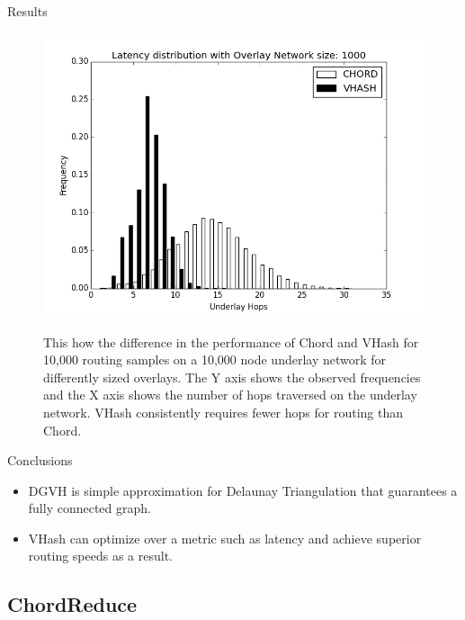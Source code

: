 \documentclass[11pt]{beamer}
\begin{document}
\begin{frame}{Results}
	\begin{figure}
		
		\centering
		\includegraphics[width=0.5\linewidth]{figs/hist_1000}
		\label{fig:hist1000}
		\caption{This how the difference in the performance of Chord and VHash for 10,000 routing samples on a 10,000 node underlay network for differently sized overlays.
			The Y axis shows the observed frequencies and the X axis shows the number of hops traversed on the underlay network.
			VHash consistently requires fewer hops for routing than Chord.}
	\end{figure}
	
\end{frame}


\begin{frame}{Conclusions}
	\begin{itemize}
		\item DGVH is simple approximation for Delaunay Triangulation that guarantees a fully connected graph.
		\item VHash can optimize over a metric such as latency and achieve superior routing speeds as a result.
	\end{itemize}
\end{frame}		






\subsection{ChordReduce}
\end{document}
